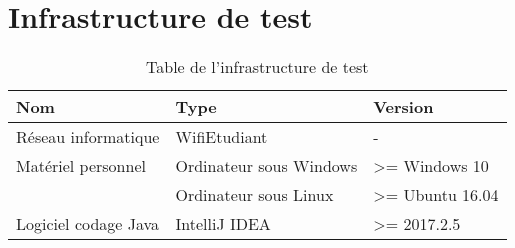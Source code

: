 
\chapter{Infrastructure de test}

\begin{table}[!h]
\begin{center}	
\begin{tabular}{|p{}|p{5cm}|p{3cm}|}
\hline
\textbf{Nom} & \textbf{Type} & \textbf{Version} \\
\hline
Réseau informatique & WifiEtudiant & - \\
\hline
Matériel personnel & Ordinateur sous Windows & >= Windows 10 \\
 & Ordinateur sous Linux & >= Ubuntu 16.04 \\
\hline
Logiciel codage Java & IntelliJ IDEA & >= 2017.2.5 \\
\hline
\end{tabular}
\end{center}
\caption{Table de l'infrastructure de test}
\end{table}